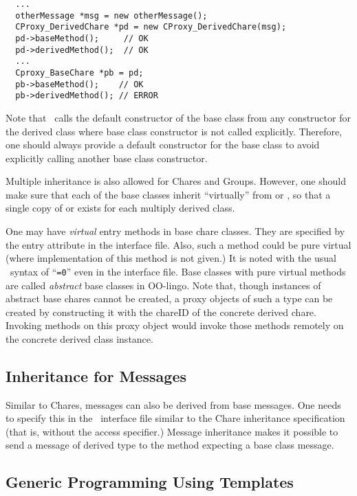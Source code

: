 \begin{verbatim}
  ...
  otherMessage *msg = new otherMessage();
  CProxy_DerivedChare *pd = new CProxy_DerivedChare(msg);
  pd->baseMethod();     // OK
  pd->derivedMethod();  // OK
  ...
  Cproxy_BaseChare *pb = pd;
  pb->baseMethod();    // OK
  pb->derivedMethod(); // ERROR
\end{verbatim}


Note that \CC\ calls the default constructor  of the base class from any
constructor for the derived class where base class constructor is not
called explicitly. Therefore, one should always provide a default constructor
for the base class to avoid explicitly calling another base class constructor.

Multiple inheritance  is also allowed for
Chares and Groups. However, one should make sure that each of the base
classes inherit ``virtually'' from  or , so that a
single copy of  or  exists for each multiply
derived class.

One may have {\em virtual} entry methods  in base chare
classes. They are specified by the entry attribute  in the
interface file. Also, such a method could be pure virtual  (where implementation of this method is not given.) It is
noted with the usual \CC\ syntax of ``{\tt =0}'' even in the interface
file. Base classes with pure virtual methods are called {\em abstract}
base classes  in OO-lingo. Note that,
though instances of abstract base chares cannot be created, a proxy
objects of such a type can be created by constructing it with the
chareID of the concrete derived chare. Invoking methods on this proxy
object would invoke those methods remotely on the concrete derived
class instance.

\subsection{Inheritance for Messages}

Similar to Chares, messages can also be derived from base messages. One needs
to specify this in the \charmpp\ interface file similar to the Chare
inheritance specification (that is, without the  access specifier.)
Message inheritance makes it possible to send a message of derived type to
the method expecting a base class message.

\subsection{Generic Programming Using Templates}

